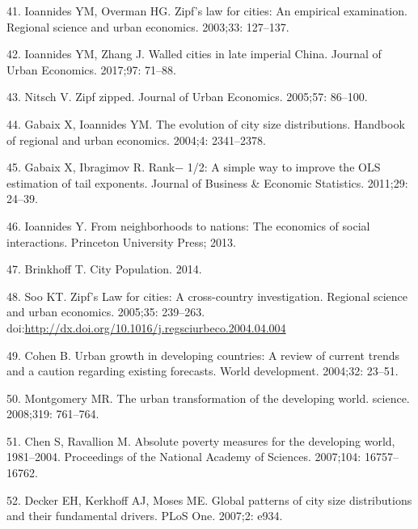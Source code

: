 \documentclass[10pt,letterpaper]{article}
\begin{document}
\leavevmode\hypertarget{ref-ioannides_zipfs_2003}{}%
41. Ioannides YM, Overman HG. Zipf's law for cities: An empirical
examination. Regional science and urban economics. 2003;33: 127--137.

\leavevmode\hypertarget{ref-ioannides_walled_2017}{}%
42. Ioannides YM, Zhang J. Walled cities in late imperial China. Journal
of Urban Economics. 2017;97: 71--88.

\leavevmode\hypertarget{ref-nitsch_zipf_2005}{}%
43. Nitsch V. Zipf zipped. Journal of Urban Economics. 2005;57: 86--100.

\leavevmode\hypertarget{ref-gabaix_evolution_2004}{}%
44. Gabaix X, Ioannides YM. The evolution of city size distributions.
Handbook of regional and urban economics. 2004;4: 2341--2378.

\leavevmode\hypertarget{ref-gabaix_rank_2011}{}%
45. Gabaix X, Ibragimov R. Rank− 1/2: A simple way to improve the OLS
estimation of tail exponents. Journal of Business \& Economic
Statistics. 2011;29: 24--39.

\leavevmode\hypertarget{ref-ioannides2013neighborhoods}{}%
46. Ioannides Y. From neighborhoods to nations: The economics of social
interactions. Princeton University Press; 2013.

\leavevmode\hypertarget{ref-thomas_brinkhoff_city_2014}{}%
47. Brinkhoff T. City Population. 2014.

\leavevmode\hypertarget{ref-soo_zipfs_2005}{}%
48. Soo KT. Zipf's Law for cities: A cross-country investigation.
Regional science and urban economics. 2005;35: 239--263.
doi:\href{https://doi.org/http://dx.doi.org/10.1016/j.regsciurbeco.2004.04.004}{http://dx.doi.org/10.1016/j.regsciurbeco.2004.04.004}

\leavevmode\hypertarget{ref-cohen_urban_2004}{}%
49. Cohen B. Urban growth in developing countries: A review of current
trends and a caution regarding existing forecasts. World development.
2004;32: 23--51.

\leavevmode\hypertarget{ref-montgomery_urban_2008}{}%
50. Montgomery MR. The urban transformation of the developing world.
science. 2008;319: 761--764.

\leavevmode\hypertarget{ref-chen_absolute_2007}{}%
51. Chen S, Ravallion M. Absolute poverty measures for the developing
world, 1981--2004. Proceedings of the National Academy of Sciences.
2007;104: 16757--16762.

\leavevmode\hypertarget{ref-decker_global_2007}{}%
52. Decker EH, Kerkhoff AJ, Moses ME. Global patterns of city size
distributions and their fundamental drivers. PLoS One. 2007;2: e934.
\end{document}

